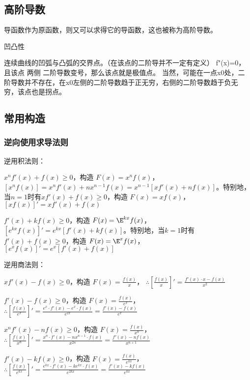 \subsection{高阶导数}

导函数作为原函数，则又可以求得它的导函数，这也被称为高阶导数。

凹凸性

连续曲线的凹弧与凸弧的交界点。（在该点的二阶导并不一定有定义）
f"(x)=0，且该点 两侧 二阶导数变号，那么该点就是极值点。
当然，可能在一点x0处，二阶导数并不存在，在x0左侧的二阶导数趋于正无穷，右侧的二阶导数趋于负无穷，该点也是拐点。

\subsection{常用构造}


\subsubsection{逆向使用求导法则}

逆用积法则：

$x^n f'(x) + f(x) \geq 0$，构造 $F(x) = x^n f(x)$，$[x^n f(x)] = x^n f'(x) + nx^{n-1} f(x) = x^{n-1} [x f'(x) + nf(x)]$。特别地，当$n=1$时有$x f'(x) + f(x) \geq 0$，构造 $F(x) = x f(x)$，$[x f(x)]' = x f'(x) + f(x)$

$f'(x) + k f(x) \geq 0$，构造 $F(x) = \E^{kx} f(x)$，$[e^{kx} f(x)]' = e^{kx} [f'(x) + kf(x)]$。特别地，当$k=1$时有$f'(x) + f(x) \geq 0$，构造 $F(x) = \E^x f(x)$，$[e^x f(x)]' = e^x [f'(x) + f(x)]$

逆用商法则：

$xf'(x) - f(x) \geq 0$，构造 $F(x) = \frac{f(x)}{x}$，  
    $\therefore \left[\frac{f(x)}{x}\right]' = \frac{f'(x) \cdot x - f(x)}{x^2}$

$f'(x) - f(x) \geq 0$，构造 $F(x) = \frac{f(x)}{e^x}$，  
    $\therefore \left[\frac{f(x)}{e^x}\right]' = \frac{e^x \cdot f'(x) - e^x \cdot f(x)}{e^{2x}} = \frac{f'(x) - f(x)}{e^x}$

$x^n f'(x) - n f(x) \geq 0$，构造 $F(x) = \frac{f(x)}{x^n}$，  
    $\therefore \left[\frac{f(x)}{x^n}\right]' = \frac{x^n \cdot f'(x) - n x^{n-1} \cdot f(x)}{x^{2n}} = \frac{f'(x) - n f(x)}{x^{n+1}}$

$f'(x) - k f(x) \geq 0$，构造 $F(x) = \frac{f(x)}{e^{kx}}$，  
    $\therefore \left[\frac{f(x)}{e^{kx}}\right]' = \frac{e^{kx} \cdot f'(x) - k e^{kx} \cdot f(x)}{e^{2kx}} = \frac{f'(x) - k f(x)}{e^{kx}}$
